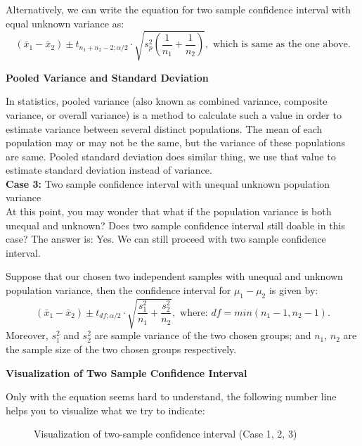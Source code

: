 Alternatively, we can write the equation for two sample confidence interval with equal unknown variance as: $$(\bar{x}_1 - \bar{x}_2)  \pm  t_{n_1+n_2-2; \alpha/2} \cdot \sqrt{s_p^2(\frac{1}{n_1} + \frac{1}{n_2})}, \text{ which is same as the one above.}$$

\textbf{Pooled Variance and Standard Deviation}

In statistics, pooled variance (also known as combined variance, composite variance, or overall variance) is a method to calculate such a value in order to estimate variance between several distinct populations. The mean of each population may or may not be the same, but the variance of these populations are same. Pooled standard deviation does similar thing, we use that value to estimate standard deviation instead of variance.\\

\textbf{Case 3:} Two sample confidence interval with unequal unknown population variance\\

At this point, you may wonder that what if the population variance is both unequal and unknown? Does two sample confidence interval still doable in this case? The answer is: Yes. We can still proceed with two sample confidence interval.

\begin{definition}
Suppose that our chosen two independent samples with unequal and unknown population variance, then the confidence interval for $\mu_1 - \mu_2$ is given by: $$(\bar{x}_1 - \bar{x}_2)  \pm t_{df; \alpha/2} \cdot \sqrt{\frac{s_1^2}{n_1} + \frac{s_2^2}{n_2}}, \text{ where: $df = min(n_1-1, n_2-1)$.}$$
Moreover, $s_1^2$ and $s_2^2$ are sample variance of the two chosen groups; and $n_1$, $n_2$ are the sample size of the two chosen groups respectively.
\end{definition}

\textbf{Visualization of Two Sample Confidence Interval}

Only with the equation seems hard to understand, the following number line helps you to visualize what we try to indicate:
\begin{center}
\begin{figure}[h!]
\centering
{}
\caption{Visualization of two-sample confidence interval (Case 1, 2, 3)}
\end{figure}
\end{center}

